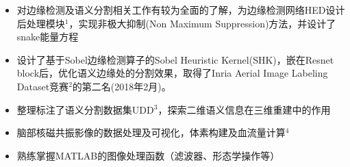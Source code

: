 \documentclass{resume}
\begin{document}
\begin{itemize}[parsep=0.5ex]
	\item 对边缘检测及语义分割相关工作有较为全面的了解，为边缘检测网络HED设计后处理模块$^1$，实现非极大抑制(Non Maximum Suppression)方法，并设计了snake能量方程
	\item 设计了基于Sobel边缘检测算子的Sobel Heuristic Kernel(SHK)，嵌在Resnet block后，优化语义边缘处的分割效果，取得了Inria Aerial Image Labeling Dataset竞赛$^2$的第二名(2018年2月)。
	\item 整理标注了语义分割数据集UDD$^3$，探索二维语义信息在三维重建中的作用
\end{itemize}

\begin{itemize}[parsep=0.5ex]
  \item 脑部核磁共振影像的数据处理及可视化，体素构建及血流量计算$^4$
  \item 熟练掌握MATLAB的图像处理函数（滤波器、形态学操作等）
\end{itemize}





\end{document}
